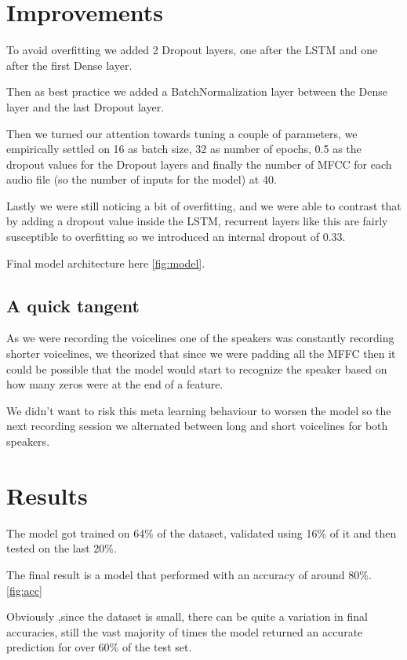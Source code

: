 \documentclass{article}
\begin{document}
\section{Improvements}
	To avoid overfitting we added 2 Dropout layers, one after the LSTM and one after the first Dense layer.

	Then as best practice we added a BatchNormalization layer between the Dense layer and the last Dropout layer.

	Then we turned our attention towards tuning a couple of parameters, we empirically settled on 16 as batch size, 32 as number of epochs, 
	0.5 as the dropout values for the Dropout layers and finally the number of MFCC for each audio file (so the number of inputs for the model) at 40.

	Lastly we were still noticing a bit of overfitting, and we were able to contrast that by adding a dropout value inside the LSTM, recurrent layers like this are
	fairly susceptible to overfitting so we introduced an internal dropout of 0.33.

	Final model architecture here \ref{fig:model}.

	\subsection{A quick tangent}
	As we were recording the voicelines one of the speakers was constantly recording shorter voicelines, we theorized that since we were padding all the 
	MFFC then it could be possible that the model would start to recognize the speaker based on how many zeros were at the end of a feature.

	We didn't want to risk this meta learning behaviour to worsen the model so the next recording session 
	we alternated between long and short voicelines for both speakers. 

\section{Results}
	The model got trained on 64\% of the dataset, validated using 16\% of it and then tested on the last 20\%.

	The final result is a model that performed with an accuracy of around 80\%. \ref{fig:acc}

	Obviously ,since the dataset is small, there can be quite a variation in final accuracies, still 
	the vast majority of times the model returned an accurate prediction for over 60\% of the test set.
\end{document}
